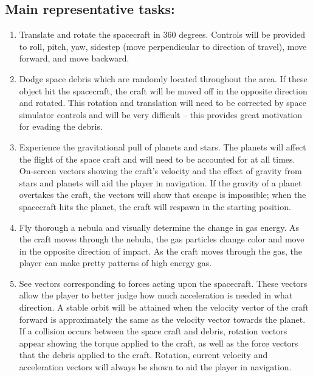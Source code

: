 \subsection{Main representative tasks:}
\begin{enumerate}

  \item Translate and rotate the spacecraft in 360 degrees.  Controls will be provided to roll, pitch, yaw, sidestep (move perpendicular to direction of travel), move forward, and move backward.

  \item Dodge space debris which are randomly located throughout the area.  If these object hit the spacecraft, the craft will be moved off in the opposite direction and rotated.  This rotation and translation will need to be corrected by space simulator controls and will be very difficult -- this provides great motivation for evading the debris.

  \item Experience the gravitational pull of planets and stars.  The planets will affect the flight of the space craft and will need to be accounted for at all times.  On-screen vectors showing the craft's velocity and the effect of gravity from stars and planets will aid the player in navigation.  If the gravity of a planet overtakes the craft, the vectors will show that escape is impossible; when the spacecraft hits the planet, the craft will respawn in the starting position.

  \item Fly thorough a nebula and visually determine the change in gas energy.  As the craft moves through the nebula, the gas particles change color and move in the opposite direction of impact.  As the craft moves through the gas, the player can make pretty patterns of high energy gas.

  \item See vectors corresponding to forces acting upon the spacecraft.  These vectors allow the player to better judge how much acceleration is needed in what direction.  A stable orbit will be attained when the velocity vector of the craft forward is approximately the same as the velocity vector towards the planet.  If a collision occurs between the space craft and debris, rotation vectors appear showing the torque applied to the craft, as well as the force vectors that the debris applied to the craft.  Rotation, current velocity and acceleration vectors will always be shown to aid the player in navigation.

\end{enumerate}

